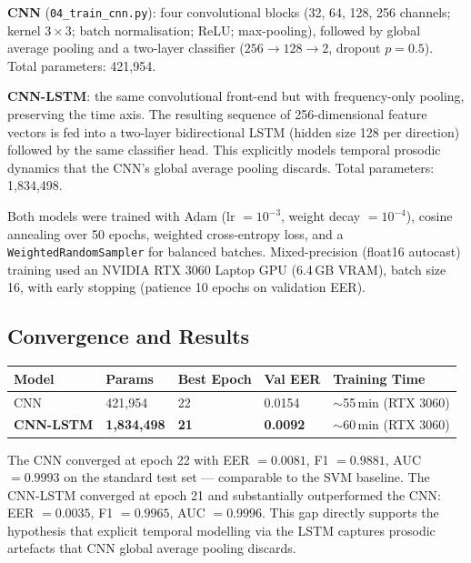 \documentclass[12pt,a4paper]{report}
\begin{document}
\textbf{CNN} (\texttt{04\_train\_cnn.py}): four convolutional blocks (32, 64, 128, 256
channels; kernel $3\times3$; batch normalisation; ReLU; max-pooling), followed by global
average pooling and a two-layer classifier ($256\to128\to2$, dropout $p=0.5$).
Total parameters: 421{,}954.

\textbf{CNN-LSTM}: the same convolutional front-end but with frequency-only pooling,
preserving the time axis. The resulting sequence of 256-dimensional feature vectors is fed
into a two-layer bidirectional LSTM (hidden size 128 per direction) followed by the same
classifier head. This explicitly models temporal prosodic dynamics that the CNN's global
average pooling discards. Total parameters: 1{,}834{,}498.

Both models were trained with Adam (lr $=10^{-3}$, weight decay $=10^{-4}$), cosine
annealing over 50 epochs, weighted cross-entropy loss, and a \texttt{WeightedRandomSampler}
for balanced batches. Mixed-precision (float16 autocast) training used an NVIDIA RTX 3060
Laptop GPU (6.4\,GB VRAM), batch size 16, with early stopping (patience 10 epochs on
validation EER).

\subsection{Convergence and Results}

\begin{center}
\begin{tabular}{L{2.6cm}C{2cm}C{2cm}C{2cm}C{3.5cm}}
  \toprule
  \color{white}\textbf{Model} &
  \color{white}\textbf{Params} &
  \color{white}\textbf{Best Epoch} &
  \color{white}\textbf{Val EER} &
  \color{white}\textbf{Training Time} \\
  \midrule
  CNN & 421{,}954 & 22 & 0.0154 & $\sim$55\,min (RTX 3060) \\
  \textbf{CNN-LSTM} & \textbf{1{,}834{,}498} & \textbf{21} & \textbf{0.0092} &
    $\sim$60\,min (RTX 3060) \\
  \bottomrule
\end{tabular}
\label{tab:convergence}
\end{center}

The CNN converged at epoch 22 with EER $=0.0081$, F1 $=0.9881$, AUC $=0.9993$ on the
standard test set --- comparable to the SVM baseline. The CNN-LSTM converged at epoch 21
and substantially outperformed the CNN: EER $=0.0035$, F1 $=0.9965$, AUC $=0.9996$. This
gap directly supports the hypothesis that explicit temporal modelling via the LSTM captures
prosodic artefacts that CNN global average pooling discards.
\end{document}
